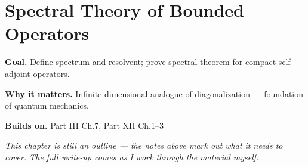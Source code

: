 \chapter{Spectral Theory of Bounded Operators}
\label{ch:12-functional-analysis-and-spectral-theory-04}

\begin{chapterintro}
\textbf{Goal.} Define spectrum and resolvent; prove spectral theorem for compact self-adjoint operators.

\textbf{Why it matters.} Infinite-dimensional analogue of diagonalization — foundation of quantum mechanics.

\textbf{Builds on.} Part III Ch.7, Part XII Ch.1–3
\end{chapterintro}

\textit{This chapter is still an outline --- the notes above mark out what it needs to cover. The full write-up comes as I work through the material myself.}
